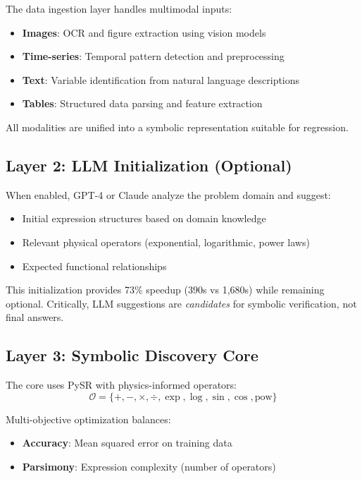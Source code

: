 \documentclass[twoside,11pt]{article}
\begin{document}
The data ingestion layer handles multimodal inputs:

\begin{itemize}
\item \textbf{Images}: OCR and figure extraction using vision models
\item \textbf{Time-series}: Temporal pattern detection and preprocessing
\item \textbf{Text}: Variable identification from natural language descriptions
\item \textbf{Tables}: Structured data parsing and feature extraction
\end{itemize}

All modalities are unified into a symbolic representation suitable for regression.

\subsection{Layer 2: LLM Initialization (Optional)}

When enabled, GPT-4 or Claude analyze the problem domain and suggest:

\begin{itemize}
\item Initial expression structures based on domain knowledge
\item Relevant physical operators (exponential, logarithmic, power laws)
\item Expected functional relationships
\end{itemize}

This initialization provides 73\% speedup (390s vs 1,680s) while remaining optional. Critically, LLM suggestions are \emph{candidates} for symbolic verification, not final answers.

\subsection{Layer 3: Symbolic Discovery Core}

The core uses PySR \citep{cranmer2023interpretable} with physics-informed operators:
\begin{equation}
\mathcal{O} = \{+, -, \times, \div, \exp, \log, \sin, \cos, \text{pow}\}
\end{equation}

Multi-objective optimization balances:
\begin{itemize}
\item \textbf{Accuracy}: Mean squared error on training data
\item \textbf{Parsimony}: Expression complexity (number of operators)
\end{itemize}
\end{document}
